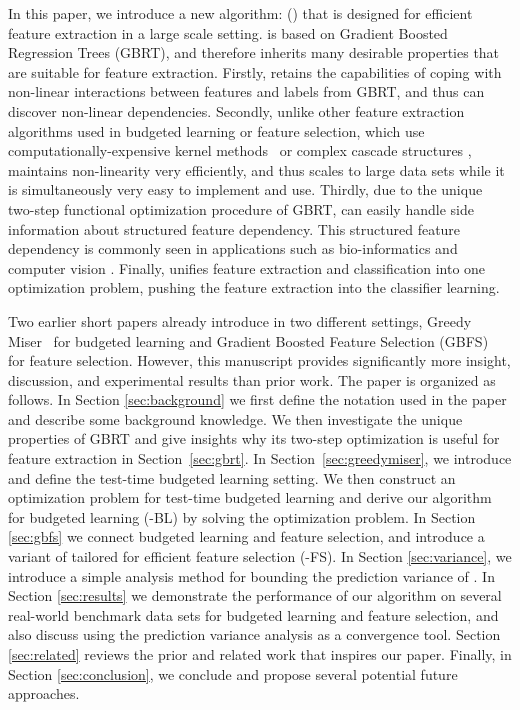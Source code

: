 In this paper, we introduce a new algorithm: \fullname{} (\name{}) that is designed for efficient feature extraction in a large scale setting. \name{} is based on Gradient Boosted Regression Trees (GBRT), and therefore inherits many desirable properties that are suitable for feature extraction. Firstly, \name{} retains the capabilities of coping with non-linear interactions between features and labels from GBRT, and thus can discover non-linear dependencies. Secondly, unlike other feature extraction algorithms used in budgeted learning or feature selection, which use computationally-expensive kernel methods~\citep{scholkopf2001learning} or complex cascade structures \citep{cambazoglu2010early,chen2011,Saberian2010,Lefakis2010}, \name{} maintains non-linearity very efficiently, and thus scales to large data sets %
while it is simultaneously %
very easy to implement and use. Thirdly, due to the unique two-step functional optimization procedure %
of GBRT, \name{} can easily handle side information about structured feature dependency. This structured feature dependency is commonly seen in applications such as bio-informatics \citep{saeys2007review} %
and computer vision \citep{felzenszwalb2010object}. Finally, \name{} unifies feature extraction and classification into one optimization problem, pushing the feature extraction into the classifier learning. 

Two earlier short papers already introduce \name{} in two different settings, Greedy Miser~\citep{greedymiser} for budgeted learning and Gradient Boosted Feature Selection (GBFS)~\citep{xu2014gradient} for feature selection. However, this manuscript provides significantly more insight, discussion, and experimental results than prior work. The paper is organized as follows. In Section \ref{sec:background} we first define the notation used in the paper and describe some background knowledge. We then investigate the unique properties of GBRT and give insights why its two-step optimization is useful for feature extraction in Section~\ref{sec:gbrt}. In Section~\ref{sec:greedymiser}, we introduce and define the test-time budgeted learning setting. We then construct an optimization problem for test-time budgeted learning and derive our algorithm for budgeted learning (\name{}-BL) by solving the optimization problem. In Section \ref{sec:gbfs} we connect budgeted learning and feature selection, and introduce a variant of \name{} tailored for efficient feature selection (\name{}-FS). In Section \ref{sec:variance}, we introduce a simple analysis method for bounding the prediction variance of \name{}. In Section \ref{sec:results} we demonstrate the performance of our algorithm on several real-world benchmark data sets for budgeted learning and feature selection, and also discuss using the prediction variance analysis as a convergence tool. Section \ref{sec:related} reviews the prior and related work that inspires our paper. Finally, in Section \ref{sec:conclusion}, we conclude and propose several potential future approaches.



